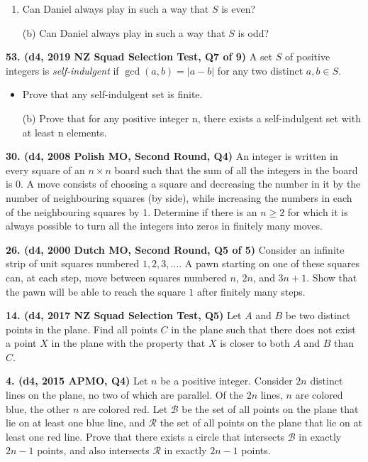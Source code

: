 \documentclass{article}
\begin{document}
        \begin{enumerate}

                \item Can Daniel always play in such a way that $S$ is even?



                \item[(b)] Can Daniel always play in such a way that $S$ is odd?

        \end{enumerate}

        \textbf{53. (\color{red}d4\color{black}, 2019 NZ Squad Selection Test, Q7 of 9)} A set $S$ of positive integers is \textit{self-indulgent} if $\gcd (a, b) = \vert a - b \vert$ for any two distinct $a, b \in S$. \begin{itemize} \item Prove that any self-indulgent set is finite. \item[(b)] Prove that for any positive integer n, there exists a self-indulgent set with at least n elements. \end{itemize}

        \textbf{30. (\color{red}d4\color{black}, 2008 Polish MO, Second Round, Q4)} An integer is written in every square of an $n \times n$ board such that the sum of all the integers in the board is 0. A move consists of choosing a square and decreasing the number in it by the number of neighbouring squares (by side), while increasing the numbers in each of the neighbouring squares by 1. Determine if there is an $n \geq 2$ for which it is always possible to turn all the integers into zeros in finitely many moves.

        \textbf{26. (\color{red}d4\color{black}, 2000 Dutch MO, Second Round, Q5 of 5)} Consider an infinite strip of unit squares numbered $1, 2, 3, \dots$. A pawn starting on one of these squares can, at each step, move between squares numbered $n$, $2n$, and $3n+1$. Show that the pawn will be able to reach the square $1$ after finitely many steps.

        \textbf{14. (\color{red}d4\color{black}, 2017 NZ Squad Selection Test, Q5)} Let $A$ and $B$ be two distinct points in the plane. Find all points $C$ in the plane such that there does not exist a point $X$ in the plane with the property that $X$ is closer to both $A$ and $B$ than $C$.

        \textbf{4. (\color{red}d4\color{black}, 2015 APMO, Q4)} Let $n$ be a positive integer. Consider $2n$ distinct lines on the plane, no two of which are parallel. Of the $2n$ lines, $n$ are colored blue, the other $n$ are colored red. Let $\mathcal{B}$ be the set of all points on the plane that lie on at least one blue line, and $\mathcal{R}$ the set of all points on the plane that lie on at least one red line. Prove that there exists a circle that intersects $\mathcal{B}$ in exactly $2n-1$ points, and also intersects $\mathcal{R}$ in exactly $2n-1$ points.
\end{document}
